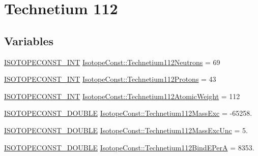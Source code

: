 \hypertarget{group___isotope_const-_technetium-_tc112}{}\section{Technetium 112}
\label{group___isotope_const-_technetium-_tc112}
\subsection*{Variables}
\begin{DoxyCompactItemize}
\item 
\mbox{\hyperlink{group___isotope_const-_macros_ga5f18360b3e99483a35c32d789e62621c}{I\+S\+O\+T\+O\+P\+E\+C\+O\+N\+S\+T\+\_\+\+I\+NT}} \mbox{\hyperlink{group___isotope_const-_technetium-_tc112_gacf4236d83335fb2c5a93b7d0f6b9081f}{Isotope\+Const\+::\+Technetium112\+Neutrons}} = 69
\item 
\mbox{\hyperlink{group___isotope_const-_macros_ga5f18360b3e99483a35c32d789e62621c}{I\+S\+O\+T\+O\+P\+E\+C\+O\+N\+S\+T\+\_\+\+I\+NT}} \mbox{\hyperlink{group___isotope_const-_technetium-_tc112_ga6c88f2668977e45fbfb0d5d6c266e2f3}{Isotope\+Const\+::\+Technetium112\+Protons}} = 43
\item 
\mbox{\hyperlink{group___isotope_const-_macros_ga5f18360b3e99483a35c32d789e62621c}{I\+S\+O\+T\+O\+P\+E\+C\+O\+N\+S\+T\+\_\+\+I\+NT}} \mbox{\hyperlink{group___isotope_const-_technetium-_tc112_gacd6949359238b5673f6b28aa5cad2e5b}{Isotope\+Const\+::\+Technetium112\+Atomic\+Weight}} = 112
\item 
\mbox{\hyperlink{group___isotope_const-_macros_ga8f45a7272ce02c0b4c65c44636ed719a}{I\+S\+O\+T\+O\+P\+E\+C\+O\+N\+S\+T\+\_\+\+D\+O\+U\+B\+LE}} \mbox{\hyperlink{group___isotope_const-_technetium-_tc112_ga0d874ec94dfb37d8b8075a8c10d2c3a0}{Isotope\+Const\+::\+Technetium112\+Mass\+Exc}} = -\/65258.
\item 
\mbox{\hyperlink{group___isotope_const-_macros_ga8f45a7272ce02c0b4c65c44636ed719a}{I\+S\+O\+T\+O\+P\+E\+C\+O\+N\+S\+T\+\_\+\+D\+O\+U\+B\+LE}} \mbox{\hyperlink{group___isotope_const-_technetium-_tc112_ga4232a050b8974f6a4c7e061ba2bfc64f}{Isotope\+Const\+::\+Technetium112\+Mass\+Exc\+Unc}} = 5.
\item 
\mbox{\hyperlink{group___isotope_const-_macros_ga8f45a7272ce02c0b4c65c44636ed719a}{I\+S\+O\+T\+O\+P\+E\+C\+O\+N\+S\+T\+\_\+\+D\+O\+U\+B\+LE}} \mbox{\hyperlink{group___isotope_const-_technetium-_tc112_gad8fa1a80d528e38104970f06f9554ba0}{Isotope\+Const\+::\+Technetium112\+Bind\+E\+PerA}} = 8353.

\end{DoxyCompactItemize}
